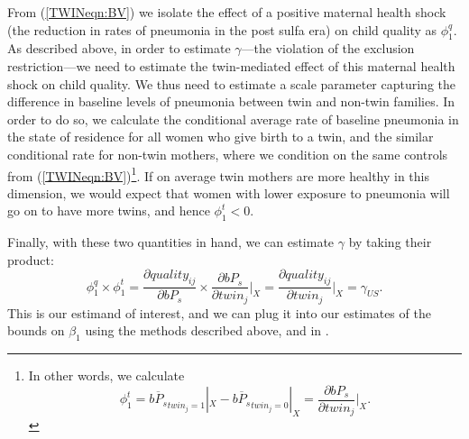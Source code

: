 \documentclass[subeqn]{article}
\begin{document}
\begin{spacing}{1.4}
From (\ref{TWINeqn:BV}) we isolate the effect of a positive maternal health
shock (the reduction in rates of pneumonia in the post sulfa era) on child
quality as $\phi^q_1$.  As described above, in order to estimate $\gamma$---the
violation of the exclusion restriction---we need to estimate the twin-mediated
effect of this maternal health shock on child quality.  We thus need to estimate
a scale parameter capturing the difference in baseline levels of pneumonia
between twin and non-twin families. %
In order to do so, we calculate the conditional average rate of baseline
pneumonia in the state of residence for all women who give birth to a twin, and
the similar conditional rate for non-twin mothers, where we condition on the same
controls from (\ref{TWINeqn:BV})\footnote{In other words, we calculate
  \[ \phi_1^t=\overline{bP_s}_{twin_j=1}|_{X}-\overline{bP_s}_{twin_j=0}|_{X}=
  \frac{\partial bP_s}{\partial twin_j}\bigg|_{X}.
  \]
}.  If on average twin mothers are more healthy in
this dimension, we would expect that women with lower exposure to pneumonia will
go on to have more twins, and hence $\phi_1^t<0$.

Finally, with these two quantities in hand, we can estimate $\gamma$ by taking
their product:
\begin{equation}
  \label{TWINeqn:realgamma}
  \phi_1^q\times\phi_1^t=\frac{\partial quality_{ij}}{\partial bP_s}\times
  \frac{\partial bP_s}{\partial twin_j}\bigg|_{X}=
  \frac{\partial quality_{ij}}{\partial twin_j}\bigg|_{X}=\gamma_{US}.
\end{equation}
This is our estimand of interest, and we can plug it into our estimates of
the bounds on $\beta_1$ using the methods described above, and in
\citet{Conleyetal2012}.




\end{spacing}
\end{document}
